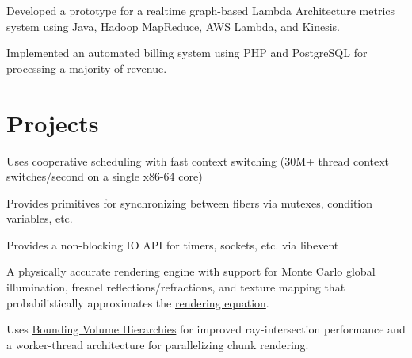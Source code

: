 \documentclass[]{resume}
\begin{document}
\begin{minipage}[t]{0.66\textwidth}
\begin{tightemize}
\item Developed a prototype for a realtime graph-based Lambda Architecture metrics system using Java, Hadoop MapReduce, AWS Lambda, and Kinesis.
\item Implemented an automated billing system using PHP and PostgreSQL for processing a majority of revenue.
\end{tightemize}
\sectionsep


\section{Projects}

\begin{tightemize}
\item Uses cooperative scheduling with fast context switching (30M+ thread context switches/second on a single x86-64 core)
\item Provides primitives for synchronizing between fibers via mutexes, condition variables, etc.
\item Provides a non-blocking IO API for timers, sockets, etc. via libevent
\end{tightemize}
\sectionsep

\begin{tightemize}
\item A physically accurate rendering engine with support for Monte Carlo global illumination, fresnel reflections/refractions, and texture mapping that probabilistically approximates the
\href{https://en.wikipedia.org/wiki/Rendering_equation}{rendering equation}.
\item Uses \href{https://en.wikipedia.org/wiki/Bounding_volume_hierarchy}{Bounding Volume Hierarchies} for improved ray-intersection performance and a worker-thread architecture for parallelizing chunk rendering.
\end{tightemize}
\sectionsep

\end{minipage}
\end{document}
